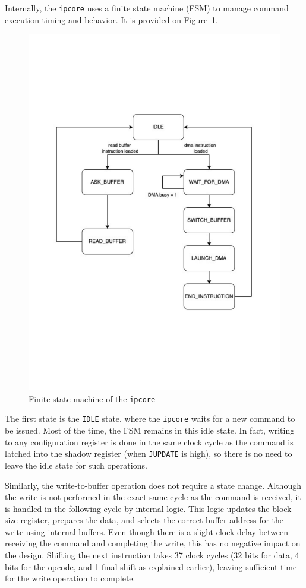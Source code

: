 \documentclass[a4paper,11pt,oneside]{report}
\begin{document}
Internally, the \texttt{ipcore} uses a finite state machine (FSM) to manage command execution timing and behavior. It is provided on Figure~\ref{fig:ipcore_fsm}.

\begin{figure}
    \centering
    \includegraphics[width=0.9\linewidth]{figures/ipcore_fsm.pdf}
    \caption{Finite state machine of the \texttt{ipcore}}
    \label{fig:ipcore_fsm}
\end{figure}

The first state is the \texttt{IDLE} state, where the \texttt{ipcore} waits for a new command to be issued.
Most of the time, the FSM remains in this idle state. In fact, writing to any configuration register is done
in the same clock cycle as the command is latched into the shadow register (when \texttt{JUPDATE} is high),
so there is no need to leave the idle state for such operations.

Similarly, the write-to-buffer operation does not require a state change.
Although the write is not performed in the exact same cycle as the command is received,
it is handled in the following cycle by internal logic. This logic updates the block size register,
prepares the data, and selects the correct buffer address for the write using internal buffers.
Even though there is a slight clock delay between receiving the command and completing the write,
this has no negative impact on the design. Shifting the next instruction takes 37 clock cycles
(32 bits for data, 4 bits for the opcode, and 1 final shift as explained earlier),
leaving sufficient time for the write operation to complete.
\end{document}
